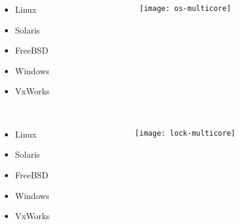 \begin{frame}[plain]
	\frametitle{ }
	\begin{columns}
		\begin{column}{.3\textwidth}
			
			\begin{itemize}\LARGE
				\item Linux
				\item Solaris
				\item FreeBSD
				\item Windows
				\item VxWorks
				
			\end{itemize}
			
		\end{column}
		
		\begin{column}{0.7\textwidth}
			
			\texttt{[image: os-multicore]}
			
		\end{column}
	\end{columns}
\end{frame}

\begin{frame}[plain]
	\frametitle{ }
	\begin{columns}[t]
		\begin{column}{.3\textwidth}
			\begin{itemize}\LARGE
				\item Linux
				\item Solaris
				\item FreeBSD
				\item Windows
				\item VxWorks
				
			\end{itemize}
			
		\end{column}
		
		\begin{column}{0.7\textwidth}
			
			\texttt{[image: lock-multicore]}
			
		\end{column}
	\end{columns}
\end{frame}

